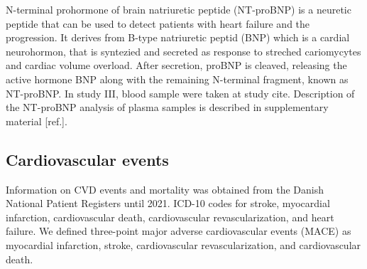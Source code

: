 \documentclass[
  a4paper,
  headsepline=true,
  open=any]{scrbook}
\begin{document}
N-terminal prohormone of brain natriuretic peptide (NT-proBNP) is a
neuretic peptide that can be used to detect patients with heart failure
and the progression. It derives from B-type natriuretic peptid (BNP)
which is a cardial neurohormon, that is syntezied and secreted as
response to streched cariomycytes and cardiac volume overload. After
secretion, proBNP is cleaved, releasing the active hormone BNP along
with the remaining N-terminal fragment, known as NT-proBNP. In study
III, blood sample were taken at study cite. Description of the NT-proBNP
analysis of plasma samples is described in supplementary material
{[}ref.{]}.

\hypertarget{cardiovascular-events}{%
\subsection{Cardiovascular events}\label{cardiovascular-events}}

Information on CVD events and mortality was obtained from the Danish
National Patient Registers until 2021. ICD-10 codes for stroke,
myocardial infarction, cardiovascular death, cardiovascular
revascularization, and heart failure. We defined three-point major
adverse cardiovascular events (MACE) as myocardial infarction, stroke,
cardiovascular revascularization, and cardiovascular death.
\end{document}
